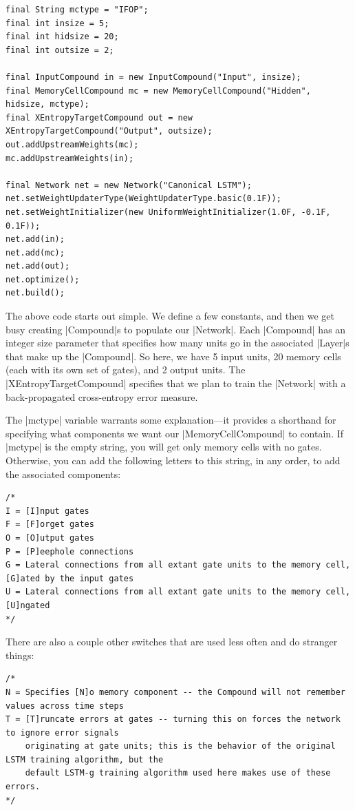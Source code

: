 \documentclass{article}
\begin{document}
\begin{verbatim}
final String mctype = "IFOP";
final int insize = 5;
final int hidsize = 20;
final int outsize = 2;

final InputCompound in = new InputCompound("Input", insize);
final MemoryCellCompound mc = new MemoryCellCompound("Hidden", hidsize, mctype);
final XEntropyTargetCompound out = new XEntropyTargetCompound("Output", outsize);
out.addUpstreamWeights(mc);
mc.addUpstreamWeights(in);

final Network net = new Network("Canonical LSTM");
net.setWeightUpdaterType(WeightUpdaterType.basic(0.1F));
net.setWeightInitializer(new UniformWeightInitializer(1.0F, -0.1F, 0.1F));
net.add(in);
net.add(mc);
net.add(out);
net.optimize();
net.build();
\end{verbatim}

The above code starts out simple. We define a few constants, and then we get busy creating |Compound|s
to populate our |Network|. Each |Compound| has an integer size parameter that specifies how many units
go in the associated |Layer|s that make up the |Compound|. So here, we have 5 input units, 20 memory
cells (each with its own set of gates), and 2 output units. The |XEntropyTargetCompound| specifies
that we plan to train the |Network| with a back-propagated cross-entropy error measure.

The |mctype| variable warrants some explanation---it provides a shorthand for specifying what
components we want our |MemoryCellCompound| to contain. If  |mctype| is the empty string, you will get
only memory cells with no gates. Otherwise, you can add the following letters to this string, in any
order, to add the associated components:

\begin{verbatim}
/*
I = [I]nput gates
F = [F]orget gates
O = [O]utput gates
P = [P]eephole connections
G = Lateral connections from all extant gate units to the memory cell, [G]ated by the input gates
U = Lateral connections from all extant gate units to the memory cell, [U]ngated
*/
\end{verbatim}
There are also a couple other switches that are used less often and do stranger things:
\begin{verbatim}
/*
N = Specifies [N]o memory component -- the Compound will not remember values across time steps
T = [T]runcate errors at gates -- turning this on forces the network to ignore error signals
    originating at gate units; this is the behavior of the original LSTM training algorithm, but the
    default LSTM-g training algorithm used here makes use of these errors.
*/
\end{verbatim}
    
\end{document}
